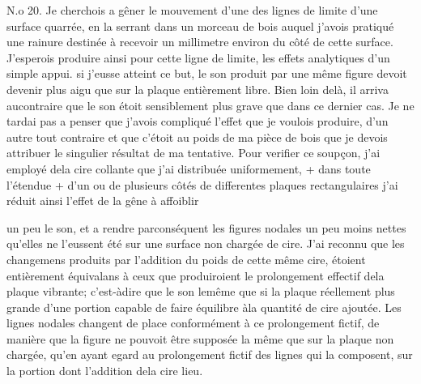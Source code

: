 \documentclass[11pt,a4paper]{article}
\begin{document}
N.o 20. Je cherchois a gêner le mouvement d'une des lignes de
limite d'une surface quarrée, en la serrant dans un morceau de
bois auquel j'avois pratiqué une rainure destinée à recevoir
un millimetre environ du côté de cette surface. J'esperois
produire  ainsi pour cette ligne de limite, les effets
analytiques d'un simple appui. si j'eusse atteint ce but,
le son  produit par une même figure devoit
devenir plus aigu que sur la plaque entièrement
libre. Bien loin delà, il arriva aucontraire que le
son étoit sensiblement plus grave que dans ce dernier
cas. Je ne tardai pas a penser que j'avois compliqué
l'effet que je voulois produire, d'un autre tout contraire
et que c'étoit au poids de ma pièce de bois que je
devois attribuer le singulier résultat de ma tentative.
Pour verifier ce soupçon, j'ai employé dela cire  collante
que j'ai distribuée uniformement, + dans toute l'étendue +
d'un ou de plusieurs côtés de differentes plaques rectangulaires
j'ai réduit ainsi l'effet de la gêne à affoiblir


un peu le son, et a rendre parconséquent les figures nodales un
peu moins nettes qu'elles ne l'eussent été sur une surface non chargée
de cire. J'ai reconnu que les changemens produits par l'addition
du poids de cette même cire, étoient entièrement équivalans
à ceux que produiroient le prolongement effectif dela
plaque vibrante; c'est-àdire que le son   lemême que si
la plaque   réellement plus grande d'une portion
capable de faire équilibre àla quantité de cire ajoutée.
 Les lignes nodales changent  de place conformément
à ce prolongement fictif, de manière que la figure ne pouvoit
être supposée la même que sur la plaque non chargée,
qu'en ayant egard au prolongement fictif des lignes qui
la composent, sur la portion dont l'addition dela cire 
lieu.
\end{document}
